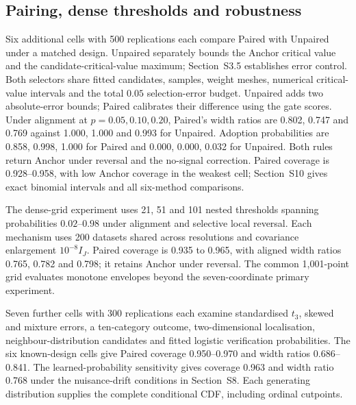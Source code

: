 

\subsection{Pairing, dense thresholds and robustness}
Six additional cells with 500 replications each compare Paired with Unpaired under a matched design.
Unpaired separately bounds the Anchor critical value and the candidate-critical-value maximum; Section~S3.5 establishes error control.
Both selectors share fitted candidates, samples, weight meshes, numerical critical-value intervals and the total $0.05$ selection-error budget.
Unpaired adds two absolute-error bounds; Paired calibrates their difference using the gate scores.
Under alignment at $p=0.05,0.10,0.20$, Paired's width ratios are 0.802, 0.747 and 0.769 against 1.000, 1.000 and 0.993 for Unpaired.
Adoption probabilities are 0.858, 0.998, 1.000 for Paired and 0.000, 0.000, 0.032 for Unpaired.
Both rules return Anchor under reversal and the no-signal correction.
Paired coverage is 0.928--0.958, with low Anchor coverage in the weakest cell; Section~S10 gives exact binomial intervals and all six-method comparisons.

The dense-grid experiment uses 21, 51 and 101 nested thresholds spanning probabilities $0.02$--$0.98$ under alignment and selective local reversal.
Each mechanism uses 200 datasets shared across resolutions and covariance enlargement $10^{-8}I_J$.
Paired coverage is 0.935 to 0.965, with aligned width ratios 0.765, 0.782 and 0.798; it retains Anchor under reversal.
The common 1,001-point grid evaluates monotone envelopes beyond the seven-coordinate primary experiment.

Seven further cells with 300 replications each examine standardised $t_3$, skewed and mixture errors, a ten-category outcome, two-dimensional localisation, neighbour-distribution candidates and fitted logistic verification probabilities.
The six known-design cells give Paired coverage 0.950--0.970 and width ratios 0.686--0.841.
The learned-probability sensitivity gives coverage 0.963 and width ratio 0.768 under the nuisance-drift conditions in Section~S8.
Each generating distribution supplies the complete conditional CDF, including ordinal cutpoints.



